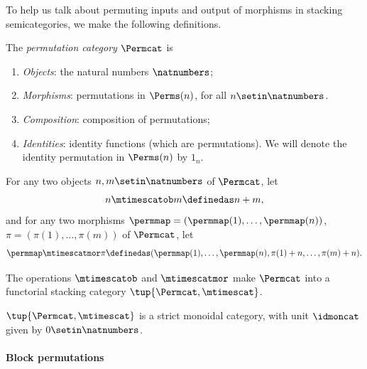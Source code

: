 To help us talk about permuting inputs and output of morphisms in stacking semicategories, we make the following definitions.

\begin{definition}\label{def:Permcat}
    The \emph{permutation category} $\Permcat$ is
    \begin{enumerate}
        \item \emph{Objects}: the natural numbers $\natnumbers$;
        \item \emph{Morphisms}: permutations in $\Perms(n)$, for all $n \setin \natnumbers$.
        \item \emph{Composition}: composition of permutations;
        \item \emph{Identities}: identity functions (which are permutations).
              We will denote the identity permutation in $\Perms(n)$ by $1_n$.
    \end{enumerate}
\end{definition}

\begin{definition}\label{def:Permcat-1}
    For any two objects $n, m \setin\natnumbers$ of $\Permcat$, let
    \begin{equation}
        n \mtimescatob m \definedas n + m,
    \end{equation}
    and for any two morphisms $\permmap = (\permmap(1), \dots, \permmap(n))$, $\pi = (\pi(1), \dots, \pi(m))$ of $\Permcat$, let
    \begin{equation}
        \permmap \mtimescatmor \pi \definedas (\permmap(1), \dots, \permmap(n), \pi(1) + n, \dots, \pi(m) + n).
    \end{equation}
\end{definition}

\begin{lemma}
    The operations $\mtimescatob$ and $\mtimescatmor$ make $\Permcat$ into a functorial stacking category $\tup{\Permcat, \mtimescat}$.
\end{lemma}


\begin{lemma}
    $\tup{\Permcat, \mtimescat}$ is a strict monoidal category, with unit $\idmoncat$ given by $0 \setin \natnumbers$.
\end{lemma}


\paragraph{Block permutations}


